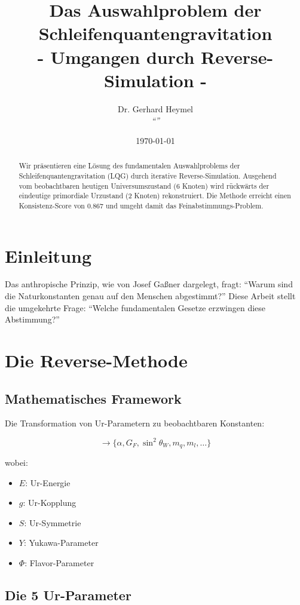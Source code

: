 \documentclass[12pt,a4paper]{article}
\title{\Huge\textbf{Das Auswahlproblem der Schleifenquantengravitation\\ 
		\Large - Umgangen durch Reverse-Simulation -}}
\author{Dr. Gerhard Heymel \\ 
	\small\textit{``''}}
\date{\today}
\begin{document}
	
	\maketitle
	
	\begin{abstract}
		Wir pr\"asentieren eine L\"osung des fundamentalen Auswahlproblems der Schleifenquantengravitation (LQG) durch iterative Reverse-Simulation. Ausgehend vom beobachtbaren heutigen Universumszustand (6 Knoten) wird r\"uckw\"arts der eindeutige primordiale Urzustand (2 Knoten) rekonstruiert. Die Methode erreicht einen Konsistenz-Score von 0.867 und umgeht damit das Feinabstimmungs-Problem.
	\end{abstract}
	
	\section{Einleitung}
	
	Das anthropische Prinzip, wie von Josef Ga{\ss}ner dargelegt, fragt: ``Warum sind die Naturkonstanten genau auf den Menschen abgestimmt?'' Diese Arbeit stellt die umgekehrte Frage: ``Welche fundamentalen Gesetze erzwingen diese Abstimmung?'' 
	
	\section{Die Reverse-Methode}
	
	\subsection{Mathematisches Framework}
	
	Die Transformation von Ur-Parametern zu beobachtbaren Konstanten:
	
	\begin{equation}
		[E, g, S, Y, \Phi] \rightarrow \{\alpha, G_F, \sin^2\theta_W, m_q, m_l, \ldots\}
	\end{equation}
	
	wobei:
	\begin{itemize}
		\item $E$: Ur-Energie
		\item $g$: Ur-Kopplung
		\item $S$: Ur-Symmetrie
		\item $Y$: Yukawa-Parameter
		\item $\Phi$: Flavor-Parameter
	\end{itemize}
	
	\subsection{Die 5 Ur-Parameter}
	
\end{document}

